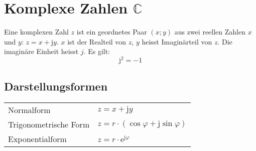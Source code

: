 \section{Komplexe Zahlen $\mathbb{C}$}
Eine komplexen Zahl $z$ ist ein geordnetes Paar $(x; y)$ aus zwei reellen Zahlen $x$ und $y$: $z = x + \mathrm j y$.
$x$ ist der Realteil von $z$, $y$ heisst Imaginärteil von $z$. Die imaginäre Einheit heisst $j$. Es gilt:
\begin{equation*}
	\mathrm j^2 = -1
\end{equation*}

\subsection{Darstellungsformen}
\settowidth{\MyLenA}{Trigonometrische Form~~}
\begin{tabular}{@{}p{\the\MyLenA}%
				@{}p{\linewidth - \the\MyLenA}}
Normalform & $z = x + \mathrm j y$ \\
Trigonometrische Form & $z = r \cdot (\cos \varphi + \mathrm j \sin \varphi)$\\
Exponentialform & $z = r \cdot \mathrm e^{\mathrm j \varphi}$
\end{tabular}


